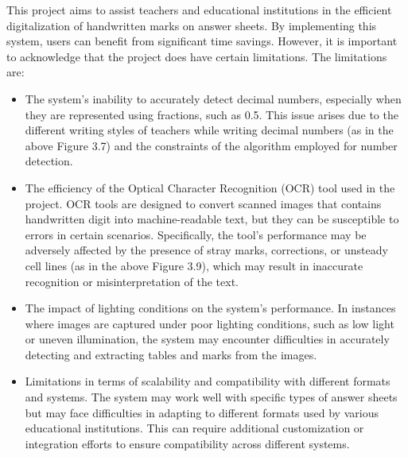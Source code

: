 This project aims to assist teachers and educational institutions in the efficient digitalization of handwritten marks on answer sheets. By implementing this system, users can benefit from significant time savings. However, it is important to acknowledge that the project does have certain limitations. The limitations are:
\begin{itemize}
    \item The system's inability to accurately detect decimal numbers, especially when they are represented using fractions, such as 0.5. This issue arises due to the different writing styles of teachers while writing decimal numbers (as in the above Figure 3.7) and the constraints of the algorithm employed for number detection.

    \item The efficiency of the Optical Character Recognition (OCR) tool used in the project. OCR tools are designed to convert scanned images that contains handwritten digit into machine-readable text, but they can be susceptible to errors in certain scenarios. Specifically, the tool's performance may be adversely affected by the presence of stray marks, corrections, or unsteady cell lines (as in the above Figure 3.9), which may result in inaccurate recognition or misinterpretation of the text.
    
    \item The impact of lighting conditions on the system's performance. In instances where images are captured under poor lighting conditions, such as low light or uneven illumination, the system may encounter difficulties in accurately detecting and extracting tables and marks from the images.

    \item Limitations in terms of scalability and compatibility with different formats and systems. The system may work well with specific types of answer sheets but may face difficulties in adapting to different formats used by various educational institutions. This can require additional customization or integration efforts to ensure compatibility across different systems.
\end{itemize} 

